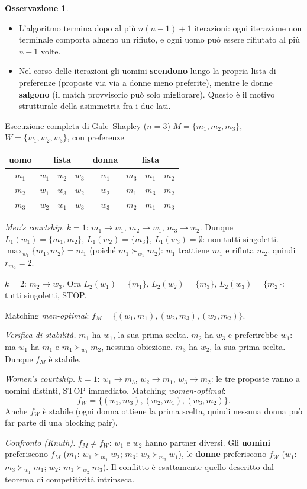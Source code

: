 \documentclass[12pt,a4paper,twoside]{book}
\theoremstyle{plain}
\theoremstyle{definition}
\newtheorem{remark}[theorem]{Osservazione}
\begin{document}
\begin{remark}
\begin{itemize}
  \item L'algoritmo termina dopo al più $n(n-1)+1$ iterazioni: ogni iterazione non terminale comporta almeno un rifiuto, e ogni uomo può essere rifiutato al più $n-1$ volte.
  \item Nel corso delle iterazioni gli uomini \textbf{scendono} lungo la propria lista di preferenze (proposte via via a donne meno preferite), mentre le donne \textbf{salgono} (il match provvisorio può solo migliorare). Questo è il motivo strutturale della asimmetria fra i due lati.
\end{itemize}
\end{remark}

\begin{exbox}{Esecuzione completa di Gale--Shapley ($n=3$)}
$M=\{m_1,m_2,m_3\}$, $W=\{w_1,w_2,w_3\}$, con preferenze
\begin{center}
\begin{tabular}{c|ccc@{\qquad}c|ccc}
\toprule
uomo & \multicolumn{3}{c}{lista} & donna & \multicolumn{3}{c}{lista}\\
\midrule
$m_1$ & $w_1$ & $w_2$ & $w_3$ & $w_1$ & $m_3$ & $m_1$ & $m_2$\\
$m_2$ & $w_1$ & $w_3$ & $w_2$ & $w_2$ & $m_1$ & $m_3$ & $m_2$\\
$m_3$ & $w_2$ & $w_1$ & $w_3$ & $w_3$ & $m_2$ & $m_1$ & $m_3$\\
\bottomrule
\end{tabular}
\end{center}

\emph{Men's courtship.} $k=1$: $m_1\to w_1$, $m_2\to w_1$, $m_3\to w_2$. Dunque $L_1(w_1)=\{m_1,m_2\}$, $L_1(w_2)=\{m_3\}$, $L_1(w_3)=\emptyset$: non tutti singoletti. $\max_{w_1}\{m_1,m_2\}=m_1$ (poiché $m_1\succ_{w_1}m_2$): $w_1$ trattiene $m_1$ e rifiuta $m_2$, quindi $r_{m_2}=2$.

$k=2$: $m_2\to w_3$. Ora $L_2(w_1)=\{m_1\}$, $L_2(w_2)=\{m_3\}$, $L_2(w_3)=\{m_2\}$: tutti singoletti, STOP.

Matching \emph{men-optimal}: $f_M=\{(w_1,m_1),(w_2,m_3),(w_3,m_2)\}$.

\emph{Verifica di stabilità.} $m_1$ ha $w_1$, la sua prima scelta. $m_2$ ha $w_3$ e preferirebbe $w_1$: ma $w_1$ ha $m_1$ e $m_1\succ_{w_1}m_2$, nessuna obiezione. $m_3$ ha $w_2$, la sua prima scelta. Dunque $f_M$ è stabile.

\emph{Women's courtship.} $k=1$: $w_1\to m_3$, $w_2\to m_1$, $w_3\to m_2$: le tre proposte vanno a uomini distinti, STOP immediato. Matching \emph{women-optimal}:
\[ f_W=\{(w_1,m_3),(w_2,m_1),(w_3,m_2)\}. \]
Anche $f_W$ è stabile (ogni donna ottiene la prima scelta, quindi nessuna donna può far parte di una blocking pair).

\emph{Confronto (Knuth).} $f_M\neq f_W$: $w_1$ e $w_2$ hanno partner diversi. Gli \textbf{uomini} preferiscono $f_M$ ($m_1$: $w_1\succ_{m_1}w_2$; $m_3$: $w_2\succ_{m_3}w_1$), le \textbf{donne} preferiscono $f_W$ ($w_1$: $m_3\succ_{w_1}m_1$; $w_2$: $m_1\succ_{w_2}m_3$). Il conflitto è esattamente quello descritto dal teorema di competitività intrinseca.
\end{exbox}
\end{document}
